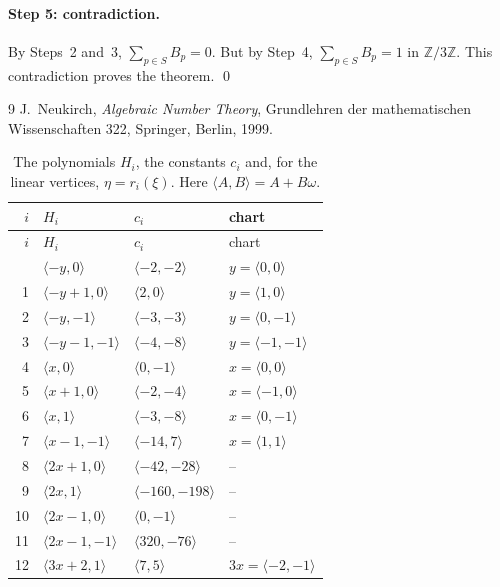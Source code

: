 \documentclass[11pt]{article}
\newcommand{\Z}{\mathbb{Z}}
\begin{document}
\paragraph{Step 5: contradiction.} By Steps~2 and~3, $\sum_{p\in S}B_p=0$. But by Step~4, $\sum_{p\in S}B_p=1$ in $\Z/3\Z$. This contradiction proves the theorem.
\qed


\begin{thebibliography}{9}
 J.~Neukirch, \emph{Algebraic Number Theory}, Grundlehren der mathematischen Wissenschaften 322, Springer, Berlin, 1999.
\end{thebibliography}

\clearpage
\begingroup\small
\setlength{\LTcapwidth}{\textwidth}
\begin{longtable}{@{}rlll@{}}
\caption{The polynomials $H_i$, the constants $c_i$ and, for the linear vertices, $\eta=r_i(\xi)$. Here $\langle A,B\rangle=A+B\omega$.}\label{tab:vert1}\\
\hline $i$ & $H_i$ & $c_i$ & chart\\\hline\endfirsthead\hline $i$ & $H_i$ & $c_i$ & chart\\\hline\endhead\hline\endfoot
0 & $\langle -y,0\rangle$ & $\langle -2,-2\rangle$ & $y=\langle 0,0\rangle$\\
1 & $\langle -y+1,0\rangle$ & $\langle 2,0\rangle$ & $y=\langle 1,0\rangle$\\
2 & $\langle -y,-1\rangle$ & $\langle -3,-3\rangle$ & $y=\langle 0,-1\rangle$\\
3 & $\langle -y-1,-1\rangle$ & $\langle -4,-8\rangle$ & $y=\langle -1,-1\rangle$\\
4 & $\langle x,0\rangle$ & $\langle 0,-1\rangle$ & $x=\langle 0,0\rangle$\\
5 & $\langle x+1,0\rangle$ & $\langle -2,-4\rangle$ & $x=\langle -1,0\rangle$\\
6 & $\langle x,1\rangle$ & $\langle -3,-8\rangle$ & $x=\langle 0,-1\rangle$\\
7 & $\langle x-1,-1\rangle$ & $\langle -14,7\rangle$ & $x=\langle 1,1\rangle$\\
8 & $\langle 2x+1,0\rangle$ & $\langle -42,-28\rangle$ & --\\
9 & $\langle 2x,1\rangle$ & $\langle -160,-198\rangle$ & --\\
10 & $\langle 2x-1,0\rangle$ & $\langle 0,-1\rangle$ & --\\
11 & $\langle 2x-1,-1\rangle$ & $\langle 320,-76\rangle$ & --\\
12 & $\langle 3x+2,1\rangle$ & $\langle 7,5\rangle$ & $3x=\langle -2,-1\rangle$\\

\end{longtable}
\end{document}
